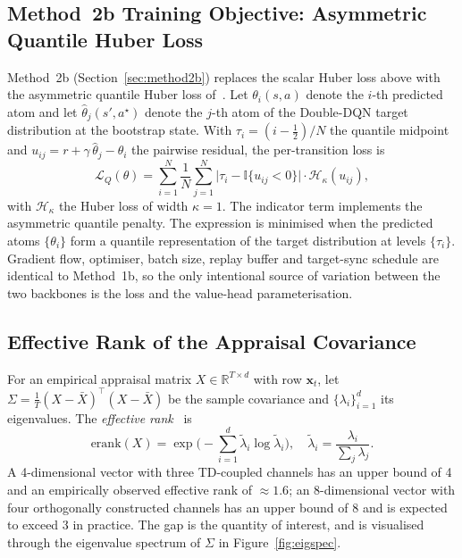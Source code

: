 \documentclass[conference]{IEEEtran}
\begin{document}
\subsection{Method~2b Training Objective: Asymmetric Quantile Huber Loss}
\label{sec:qhuber}
Method~2b (Section~\ref{sec:method2b}) replaces the scalar Huber loss above
with the asymmetric quantile Huber loss of~\cite{dabney2018qrdqn}. Let
$\theta_{i}(s, a)$ denote the $i$-th predicted atom and let
$\hat\theta_{j}(s', a^{\star})$ denote the $j$-th atom of the Double-DQN
target distribution at the bootstrap state. With $\tau_{i} = (i -
\tfrac{1}{2})/N$ the quantile midpoint and $u_{ij} = r + \gamma\,
\hat\theta_{j} - \theta_{i}$ the pairwise residual, the per-transition
loss is
\begin{equation}
\mathcal{L}_{Q}(\theta) = \sum_{i=1}^{N} \frac{1}{N}\sum_{j=1}^{N}
\big| \tau_{i} - \mathbb{I}\{u_{ij} < 0\} \big| \cdot
\mathcal{H}_{\kappa}(u_{ij}),
\label{eq:qhuber}
\end{equation}
with $\mathcal{H}_{\kappa}$ the Huber loss of width $\kappa = 1$. The
indicator term implements the asymmetric quantile penalty. The expression
is minimised when the predicted atoms $\{\theta_{i}\}$ form a quantile
representation of the target distribution at levels $\{\tau_{i}\}$.
Gradient flow, optimiser, batch size, replay buffer and target-sync
schedule are identical to Method~1b, so the only intentional source of
variation between the two backbones is the loss and the value-head
parameterisation.

\subsection{Effective Rank of the Appraisal Covariance}
For an empirical appraisal matrix $X \in \mathbb{R}^{T \times d}$ with row
$\mathbf{x}_{t}$, let $\Sigma = \tfrac{1}{T}(X - \bar X)^{\top}(X - \bar X)$
be the sample covariance and $\{\lambda_{i}\}_{i=1}^{d}$ its eigenvalues.
The \emph{effective rank}~\cite{roy2007effective} is
\begin{equation}
\mathrm{erank}(X) = \exp\Big( - \sum_{i=1}^{d} \tilde\lambda_{i} \log \tilde\lambda_{i} \Big),
\quad \tilde\lambda_{i} = \frac{\lambda_{i}}{\sum_{j} \lambda_{j}}.
\end{equation}
A 4-dimensional vector with three TD-coupled channels has an upper bound of
4 and an empirically observed effective rank of $\approx 1.6$; an
8-dimensional vector with four orthogonally constructed channels has an
upper bound of 8 and is expected to exceed 3 in practice. The gap is the
quantity of interest, and is visualised through the eigenvalue spectrum
of $\Sigma$ in Figure~\ref{fig:eigspec}.
\end{document}
